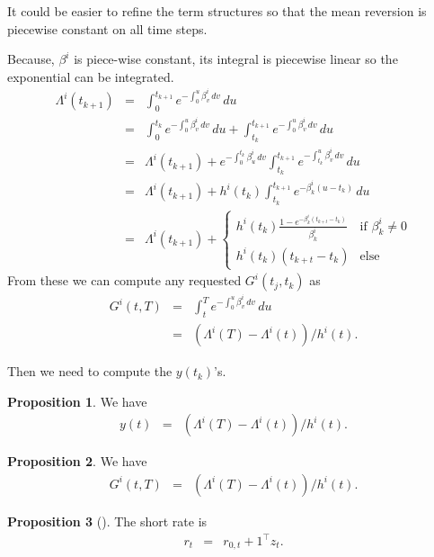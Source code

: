 \documentclass[11pt,english]{amsart}
\theoremstyle{definition}
\newtheorem{prop}{Proposition}
\begin{document}
It could be easier to refine the term structures so that the mean reversion is piecewise constant on all time steps.

Because, $\beta^i$ is piece-wise constant, its integral is piecewise linear so the exponential can be integrated.
\begin{eqnarray*}
	\Lambda^i(t_{k+1})  
	&=& \int_0^{t_{k+1}} e^{-\int_0^u  \beta^i_v \,dv } \, du  \\
	&=& \int_0^{t_{k}} e^{-\int_0^u  \beta^i_v \,dv } \, du  
	+  \int_{t_{k}}^{t_{k+1}} e^{-\int_0^u  \beta^i_v \,dv } \, du  \\
	&=& \Lambda^i(t_{k+1})    
	+  e^{-\int_0^{t_k}  \beta^i_u \,dv }  \int_{t_{k}}^{t_{k+1}} e^{-\int_{t_k}^u  \beta^i_v \,dv } \, du  \\
	&=& \Lambda^i(t_{k+1})    
	+  h^i(t_k) \int_{t_{k}}^{t_{k+1}} e^{-\beta^i_k (u-t_k) } \, du  \\
	&=& \Lambda^i(t_{k+1})  + \begin{cases}
	h^i(t_k) \frac{1-e^{-\beta^i_k(t_{k+t}-t_k)}}{\beta^i_k}   & \textrm{if $\beta^i_k \neq 0$} \\ 
	h^i(t_k) (t_{k+t}-t_k)  & \textrm{else} 
	\end{cases}
\end{eqnarray*}
From these we can compute any requested $G^i(t_j,t_k)$ as 
\begin{eqnarray*}
	G^i(t,T) &=& \int_{t}^T  e^{-\int_0^u  \beta^i_v \,dv } \, du \\ 
	&=& \left(\Lambda^i(T) - \Lambda^i(t)\right) / h^i(t) .
\end{eqnarray*}

Then we need to compute the $y(t_k)$'s.
\begin{prop}
We have
\begin{eqnarray}
	y(t) &=& \left(\Lambda^i(T) - \Lambda^i(t)\right) / h^i(t) .
\end{eqnarray}
\end{prop}



\begin{prop}
We have
\begin{eqnarray}
	G^i(t,T) &=& \left(\Lambda^i(T) - \Lambda^i(t)\right) / h^i(t) .
\end{eqnarray}
\end{prop}



\begin{prop}[]
The short rate is 
\begin{eqnarray}
	r_t &=& r_{0,t} + 1^\top z_t .
\end{eqnarray}
\end{prop}
\end{document}
